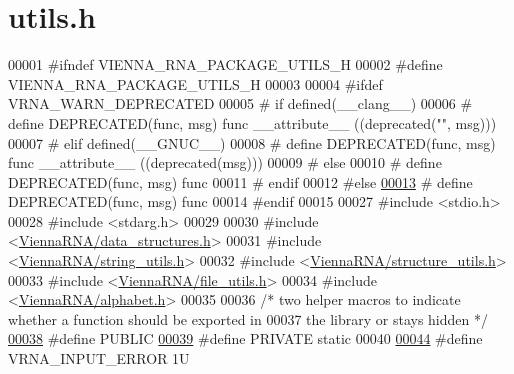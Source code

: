 \hypertarget{utils_8h_source}{}\section{utils.\+h}
\label{utils_8h_source}

\begin{DoxyCode}
00001 \textcolor{preprocessor}{#ifndef VIENNA\_RNA\_PACKAGE\_UTILS\_H}
00002 \textcolor{preprocessor}{#define VIENNA\_RNA\_PACKAGE\_UTILS\_H}
00003 
00004 \textcolor{preprocessor}{#ifdef VRNA\_WARN\_DEPRECATED}
00005 \textcolor{preprocessor}{# if defined(\_\_clang\_\_)}
00006 \textcolor{preprocessor}{#  define DEPRECATED(func, msg) func \_\_attribute\_\_ ((deprecated("", msg)))}
00007 \textcolor{preprocessor}{# elif defined(\_\_GNUC\_\_)}
00008 \textcolor{preprocessor}{#  define DEPRECATED(func, msg) func \_\_attribute\_\_ ((deprecated(msg)))}
00009 \textcolor{preprocessor}{# else}
00010 \textcolor{preprocessor}{#  define DEPRECATED(func, msg) func}
00011 \textcolor{preprocessor}{# endif}
00012 \textcolor{preprocessor}{#else}
\mbox{\hyperlink{utils_8h_aab347a3c03fbe8e7319551b9fa0cce4a}{00013}} \textcolor{preprocessor}{# define DEPRECATED(func, msg) func}
00014 \textcolor{preprocessor}{#endif}
00015 
00027 \textcolor{preprocessor}{#include <stdio.h>}
00028 \textcolor{preprocessor}{#include <stdarg.h>}
00029 
00030 \textcolor{preprocessor}{#include <\mbox{\hyperlink{data__structures_8h}{ViennaRNA/data\_structures.h}}>}
00031 \textcolor{preprocessor}{#include <\mbox{\hyperlink{string__utils_8h}{ViennaRNA/string\_utils.h}}>}
00032 \textcolor{preprocessor}{#include <\mbox{\hyperlink{structure__utils_8h}{ViennaRNA/structure\_utils.h}}>}
00033 \textcolor{preprocessor}{#include <\mbox{\hyperlink{file__utils_8h}{ViennaRNA/file\_utils.h}}>}
00034 \textcolor{preprocessor}{#include <\mbox{\hyperlink{alphabet_8h}{ViennaRNA/alphabet.h}}>}
00035 
00036 \textcolor{comment}{/* two helper macros to indicate whether a function should be exported in}
00037 \textcolor{comment}{the library or stays hidden */}
\mbox{\hyperlink{group__utils_gad17d551e31d1828c68acf40684849b7e}{00038}} \textcolor{preprocessor}{#define PUBLIC}
\mbox{\hyperlink{group__utils_ga5e151c615eda34903514212f05a5ccf8}{00039}} \textcolor{preprocessor}{#define PRIVATE static}
00040 
\mbox{\hyperlink{group__utils_gad403c9ea58f1836689404c2931419c8c}{00044}} \textcolor{preprocessor}{#define VRNA\_INPUT\_ERROR                  1U}

\end{DoxyCode}
